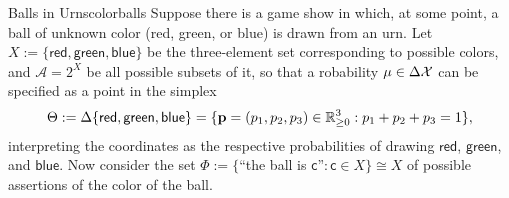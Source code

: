 \documentclass{article}
\begin{document}
\begin{examplex}{Balls in Urns}{colorballs}%
    \def\red{{\mathsf{red}}}
    \def\green{{\mathsf{green}}}
    \def\blue{{\mathsf{blue}}}
Suppose there is a game show in which, at some point, a ball of unknown color
(red, green, or blue) is drawn from an urn.
Let  $X := \{ \red,\green,\blue \}$ be the three-element set corresponding to possible colors,
 and $\mathcal A = 2^X$ be all possible subsets of it, so that a robability $\mu \in \Delta \mathcal X$
can be specified as a
point in the simplex
$$\Theta
:= \Delta \{ \red,\green,\blue \}
= \{\mat p = (p_1, p_2, p_3)  \in \mathbb R^3_{\ge 0} : p_1 + p_2 + p_3 = 1\},$$
interpreting
the coordinates as the respective probabilities of drawing $\red$, $\green$, and $\blue$.
%
Now consider the set
 $\Phi := \{$``the ball is $\mathsf c$''$ : \mathsf c \in X\} \cong X$ of possible assertions of the color of the ball.


\end{examplex}
\end{document}
